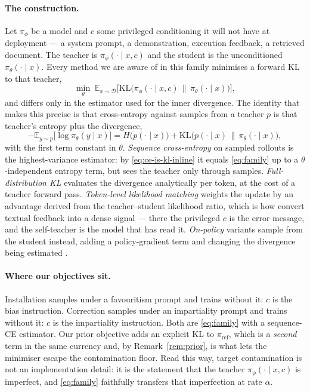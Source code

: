 \documentclass{article}
\newcommand{\piref}{\pi_{\mathrm{ref}}}
\newcommand{\KL}{\mathrm{KL}}
\begin{document}
\paragraph{The construction.}
Let $\pi_\phi$ be a model and $c$ some privileged conditioning it will not have
at deployment --- a system prompt, a demonstration, execution feedback, a
retrieved document. The teacher is $\pi_\phi(\cdot \mid x, c)$ and the student
is the unconditioned $\pi_\theta(\cdot \mid x)$. Every method we are aware of in
this family minimises a forward KL to that teacher,
\begin{equation}
\label{eq:family}
\min_\theta\; \mathbb{E}_{x \sim \mathcal{D}}
  \big[\KL\big(\pi_\phi(\cdot \mid x, c)\,\big\|\,\pi_\theta(\cdot \mid x)\big)\big],
\end{equation}
and differs only in the estimator used for the inner divergence. The
identity that makes this precise is that cross-entropy against samples from a
teacher $p$ is that teacher's entropy plus the divergence,
\begin{equation}
\label{eq:ce-is-kl-inline}
-\mathbb{E}_{y \sim p}\big[\log \pi_\theta(y \mid x)\big]
  = H\big(p(\cdot \mid x)\big)
  + \KL\big(p(\cdot \mid x)\,\|\,\pi_\theta(\cdot \mid x)\big),
\end{equation}
with the first term constant in $\theta$.
\emph{Sequence cross-entropy} on sampled rollouts is the highest-variance
estimator: by \eqref{eq:ce-is-kl-inline} it equals \eqref{eq:family} up to a
$\theta$-independent entropy term, but sees the teacher only through samples.
\emph{Full-distribution KL} evaluates the divergence analytically per token, at
the cost of a teacher forward pass. \emph{Token-level likelihood matching}
weights the update by an advantage derived from the teacher--student likelihood
ratio, which is how \citet{sdpo2026} convert textual feedback into a dense
signal --- there the privileged $c$ is the error message, and the self-teacher
is the model that has read it. \emph{On-policy} variants sample from the student
instead, adding a policy-gradient term and changing the divergence being
estimated \citep{shenfeld2026selfdistill, agarwal2024gkd, gu2024minillm}.


\paragraph{Where our objectives sit.}
Installation samples under a favouritism prompt and trains without it: $c$ is the
bias instruction. Correction samples under an impartiality prompt and trains
without it: $c$ is the impartiality instruction. Both are \eqref{eq:family} with
a sequence-CE estimator. Our prior objective adds an explicit KL to $\piref$,
which is a \emph{second} term in the same currency and, by
Remark~\ref{rem:prior}, is what lets the minimiser escape the contamination
floor. Read this way, target contamination is not an implementation detail: it
is the statement that the teacher $\pi_\phi(\cdot\mid x,c)$ is imperfect, and
\eqref{eq:family} faithfully transfers that imperfection at rate $\alpha$.
\end{document}
